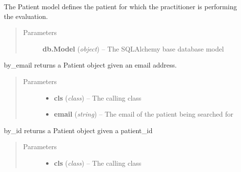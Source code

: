\documentclass[letterpaper,10pt,english]{sphinxmanual}
\begin{document}
\begin{fulllineitems}
\label{dev-patients:cagenix.patients.models.Patient}
The Patient model defines the patient for which the practitioner is
performing the evaluation.
\begin{quote}\begin{description}
\item[{Parameters}] \leavevmode
\textbf{db.Model} (\emph{object}) -- The SQLAlchemy base database model

\end{description}\end{quote}

\begin{fulllineitems}
\label{dev-patients:cagenix.patients.models.Patient.by_email}
by\_email returns a Patient object given an email address.
\begin{quote}\begin{description}
\item[{Parameters}] \leavevmode\begin{itemize}
\item {} 
\textbf{cls} (\emph{class}) -- The calling class

\item {} 
\textbf{email} (\emph{string}) -- The email of the patient being searched for

\end{itemize}

\end{description}\end{quote}

\end{fulllineitems}


\begin{fulllineitems}
\label{dev-patients:cagenix.patients.models.Patient.by_id}
by\_id returns a Patient object given a patient\_id
\begin{quote}\begin{description}
\item[{Parameters}] \leavevmode\begin{itemize}
\item {} 
\textbf{cls} (\emph{class}) -- The calling class


\end{itemize}
\end{description}
\end{quote}
\end{fulllineitems}
\end{fulllineitems}
\end{document}
